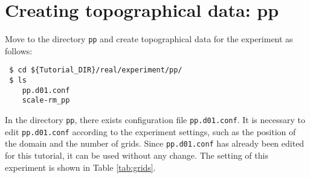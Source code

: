 \section{Creating topographical data: pp} \label{sec:tutorial_real_pp}

Move to the directory \verb|pp| and create topographical data for the experiment as follows:
\begin{verbatim}
 $ cd ${Tutorial_DIR}/real/experiment/pp/
 $ ls
    pp.d01.conf
    scale-rm_pp
\end{verbatim}
In the directory \verb|pp|, there exists configuration file \verb|pp.d01.conf|.
It is necessary to edit \verb|pp.d01.conf| according to the experiment settings,
such as the position of the domain and the number of grids.
Since \verb|pp.d01.conf| has already been edited for this tutorial, it can be used without any change.
The setting of this experiment is shown in Table \ref{tab:grids}.

